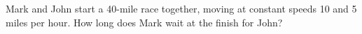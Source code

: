 Mark and John start a 40-mile race together, moving at constant speeds 10 and 5 miles per hour. How long does Mark wait at the finish for John?
